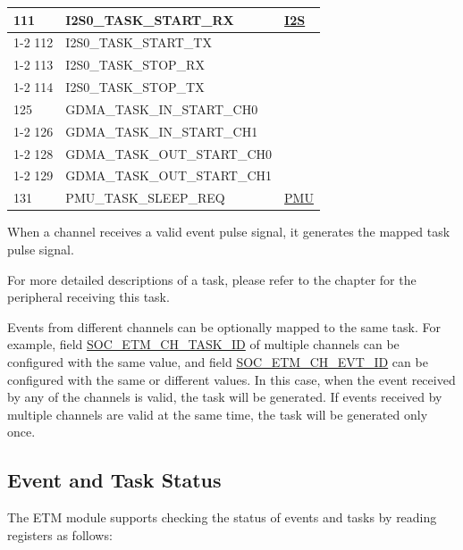 \documentclass[main\_\_EN.tex]{subfiles}
\begin{document}
\begin{longtable}{ | l | l | l | }
111 & I2S0\_TASK\_START\_RX   & \hyperref[mod:i2s]{I2S}   \\ \cline{1-2}
112 & I2S0\_TASK\_START\_TX   & \\ \cline{1-2}
113 & I2S0\_TASK\_STOP\_RX    & \\ \cline{1-2}
114 & I2S0\_TASK\_STOP\_TX    & \\ \hline
125 & GDMA\_TASK\_IN\_START\_CH0    & \nameref{mod:dma}  \\ \cline{1-2}
126 & GDMA\_TASK\_IN\_START\_CH1    & \\ \cline{1-2}
128 & GDMA\_TASK\_OUT\_START\_CH0   & \\ \cline{1-2}
129 & GDMA\_TASK\_OUT\_START\_CH1   & \\ \hline
131 & PMU\_TASK\_SLEEP\_REQ  & \hyperref[mod:lowpowm]{PMU} \\ \hline
\end{longtable}

When a channel receives a valid event pulse signal, it generates the mapped task pulse signal.

For more detailed descriptions of a task, please refer to the chapter for the peripheral receiving this task.

Events from different channels can be optionally mapped to the same task. For example, field \hyperref[fielddesc:SOCETMCH0TASKID]{SOC\_ETM\_CH\_TASK\_ID} of multiple channels can be configured with the same value, and field \hyperref[fielddesc:SOCETMCH0EVTID]{SOC\_ETM\_CH\_EVT\_ID} can be configured with the same or different values. In this case, when the event received by any of the channels is valid, the task will be generated. If events received by multiple channels are valid at the same time, the task will be generated only once.

\subsection{Event and Task Status}

The ETM module supports checking the status of events and tasks by reading registers as follows:
\end{document}
